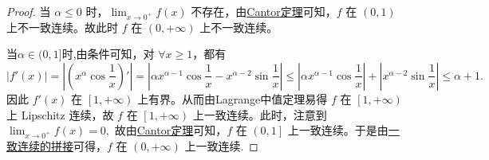 \documentclass[lang=cn,newtx,10pt,scheme=chinese]{elegantbook}
\begin{document}
\begin{proof}
当 $\alpha \leqslant 0$ 时，$\lim_{x \rightarrow 0^+} f\left( x \right)$ 不存在，由\hyperref[theorem:Cantor定理]{Cantor定理}可知，$f$ 在 $\left( 0,1 \right)$ 上不一致连续。故此时 $f$ 在 $\left( 0,+\infty \right)$ 上不一致连续。

当$\alpha \in (0,1]$时,由条件可知，对 $\forall x \geqslant 1$，都有
\[
\left| f'\left( x \right) \right| = \left| \left( x^{\alpha} \cos \frac{1}{x} \right)' \right| = \left| \alpha x^{\alpha - 1} \cos \frac{1}{x} - x^{\alpha - 2} \sin \frac{1}{x} \right| \leqslant \left| \alpha x^{\alpha - 1} \cos \frac{1}{x} \right| + \left| x^{\alpha - 2} \sin \frac{1}{x} \right| \leqslant \alpha + 1.
\]
因此 $f'\left( x \right)$ 在 $\left[ 1, +\infty \right)$ 上有界。从而由Lagrange中值定理易得 $f$ 在 $\left[ 1,+\infty \right)$ 上 Lipschitz 连续，故 $f$ 在 $\left[ 1,+\infty \right)$ 上一致连续。此时，注意到
\(
\lim_{x \rightarrow 0^+} f\left( x \right) = 0,
\)
故由\hyperref[theorem:Cantor定理]{Cantor定理}可知，$f$ 在 $\left( 0,1 \right]$ 上一致连续。于是由\hyperref[proposition:一致连续函数的拼接]{一致连续的拼接}可得，$f$ 在 $\left( 0,+\infty \right)$ 上一致连续.


\end{proof}
\end{document}
